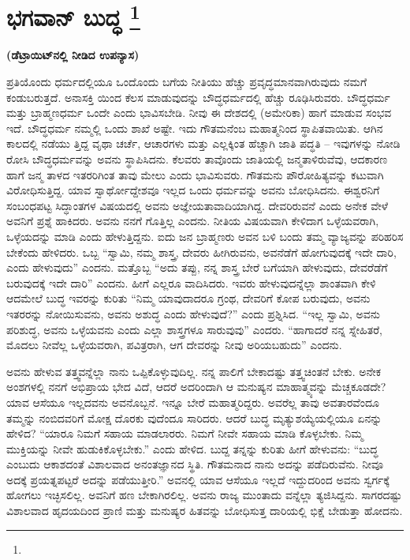 
\chapter[ಭಗವಾನ್ ಬುದ್ಧ ]{ಭಗವಾನ್ ಬುದ್ಧ \protect\footnote{}}

\centerline{\textbf{(ಡೆಟ್ರಾಯಿಟ್​ನಲ್ಲಿ ನೀಡಿದ ಉಪನ್ಯಾಸ)}}

ಪ್ರತಿಯೊಂದು ಧರ್ಮದಲ್ಲಿಯೂ ಒಂದೊಂದು ಬಗೆಯ ನೀತಿಯು ಹೆಚ್ಚು ಪ್ರವೃದ್ಧಮಾನವಾಗಿರುವುದು ನಮಗೆ ಕಂಡುಬರುತ್ತದೆ. ಅನಾಸಕ್ತಿ ಯಿಂದ ಕೆಲಸ ಮಾಡುವುದನ್ನು ಬೌದ್ಧಧರ್ಮದಲ್ಲಿ ಹೆಚ್ಚು ರೂಢಿಸಿರುವರು. ಬೌದ್ಧಧರ್ಮ ಮತ್ತು ಬ್ರಾಹ್ಮಣಧರ್ಮ ಒಂದೇ ಎಂದು ಭಾವಿಸಬೇಡಿ. ನೀವು ಈ ದೇಶದಲ್ಲಿ (ಅಮೇರಿಕಾ) ಹಾಗೆ ಮಾಡುವ ಸಂಭವ ಇದೆ. ಬೌದ್ಧಧರ್ಮ ನಮ್ಮಲ್ಲಿ ಒಂದು ಶಾಖೆ ಅಷ್ಟೇ. ಇದು ಗೌತಮನೆಂಬ ಮಹಾತ್ಮನಿಂದ ಸ್ಥಾಪಿತವಾಯಿತು. ಆಗಿನ ಕಾಲದಲ್ಲಿ ನಡೆಯು ತ್ತಿದ್ದ ವೃಥಾ ಚರ್ಚೆ, ಆಚಾರಗಳು ಮತ್ತು ಎಲ್ಲಕ್ಕಿಂತ ಹೆಚ್ಚಾಗಿ ಜಾತಿ ಪದ್ಧತಿ – ಇವುಗಳನ್ನು ನೋಡಿ ರೋಸಿ ಬೌದ್ಧಧರ್ಮವನ್ನು ಅವನು ಸ್ಥಾಪಿಸಿದನು. ಕೆಲವರು ತಾವೊಂದು ಜಾತಿಯಲ್ಲಿ ಜನ್ಮತಾಳಿರುವೆವು, ಆದಕಾರಣ ಹಾಗೆ ಜನ್ಮ ತಾಳದ ಇತರರಿಗಿಂತ ತಾವು ಮೇಲು ಎಂದು ಭಾವಿಸುವರು. ಗೌತಮನು ಪೌರೋಹಿತ್ಯವನ್ನು ಕಟುವಾಗಿ ವಿರೋಧಿಸುತ್ತಿದ್ದ. ಯಾವ ಸ್ವಾರ್ಥೋದ್ದೇಶವೂ ಇಲ್ಲದ ಒಂದು ಧರ್ಮವನ್ನು ಅವನು ಬೋಧಿಸಿದನು. ಈಶ್ವರನಿಗೆ ಸಂಬಂಧಪಟ್ಟ ಸಿದ್ಧಾಂತಗಳ ವಿಷಯದಲ್ಲಿ ಅವನು ಅಜ್ಞೇಯತಾವಾದಿಯಾಗಿದ್ದ. ದೇವರಿರುವನೆ ಎಂದು ಅನೇಕ ವೇಳೆ ಅವನಿಗೆ ಪ್ರಶ್ನೆ ಹಾಕಿದರು. ಅವನು ನನಗೆ ಗೊತ್ತಿಲ್ಲ ಎಂದನು. ನೀತಿಯ ವಿಷಯವಾಗಿ ಕೇಳಿದಾಗ ಒಳ್ಳೆಯವರಾಗಿ, ಒಳ್ಳೆಯದನ್ನು ಮಾಡಿ ಎಂದು ಹೇಳುತ್ತಿದ್ದನು. ಐದು ಜನ ಬ್ರಾಹ್ಮಣರು ಅವನ ಬಳಿ ಬಂದು ತಮ್ಮ ವ್ಯಾಜ್ಯವನ್ನು ಪರಿಹರಿಸ ಬೇಕೆಂದು ಹೇಳಿದರು. ಒಬ್ಬ “ಸ್ವಾಮಿ, ನಮ್ಮ ಶಾಸ್ತ್ರ, ದೇವರು ಹೀಗಿರುವನು, ಅವನೆಡೆಗೆ ಹೋಗುವುದಕ್ಕೆ ಇದೇ ದಾರಿ, ಎಂದು ಹೇಳುವುದು” ಎಂದನು. ಮತ್ತೊಬ್ಬ “ಅದು ತಪ್ಪು, ನನ್ನ ಶಾಸ್ತ್ರ ಬೇರೆ ಬಗೆಯಾಗಿ ಹೇಳುವುದು, ದೇವರೆಡೆಗೆ ಬರುವುದಕ್ಕೆ ಇದೇ ದಾರಿ” ಎಂದನು. ಹೀಗೆ ಎಲ್ಲರೂ ವಾದಿಸಿದರು. ಇವರು ಹೇಳುವುದನ್ನೆಲ್ಲಾ ಶಾಂತವಾಗಿ ಕೇಳಿ ಆದಮೇಲೆ ಬುದ್ಧ ಇವರನ್ನು ಕುರಿತು “ನಿಮ್ಮ ಯಾವುದಾದರೂ ಗ್ರಂಥ, ದೇವರಿಗೆ ಕೋಪ ಬರುವುದು, ಅವನು ಇತರರನ್ನು ನೋಯಿಸುವನು, ಅವನು ಅಶುದ್ಧ ಎಂದು ಹೇಳುವುದೆ?” ಎಂದು ಪ್ರಶ್ನಿಸಿದ. “ಇಲ್ಲ ಸ್ವಾಮಿ, ಅವನು ಪರಿಶುದ್ಧ, ಅವನು ಒಳ್ಳೆಯವನು ಎಂದು ಎಲ್ಲಾ ಶಾಸ್ತ್ರಗಳೂ ಸಾರುವುವು” ಎಂದರು. “ಹಾಗಾದರೆ ನನ್ನ ಸ್ನೇಹಿತರೆ, ಮೊದಲು ನೀವೆಲ್ಲ ಒಳ್ಳೆಯವರಾಗಿ, ಪವಿತ್ರರಾಗಿ, ಆಗ ದೇವರನ್ನು ನೀವು ಅರಿಯಬಹುದು” ಎಂದನು.

ಅವನು ಹೇಳುವ ತತ್ತ್ವವನ್ನೆಲ್ಲಾ ನಾನು ಒಪ್ಪಿಕೊಳ್ಳುವುದಿಲ್ಲ. ನನ್ನ ಪಾಲಿಗೆ ಬೇಕಾದಷ್ಟು ತತ್ತ್ವಚಿಂತನೆ ಬೇಕು. ಅನೇಕ ಅಂಶಗಳಲ್ಲಿ ನನಗೆ ಅಭಿಪ್ರಾಯ ಭೇದ ವಿದೆ, ಆದರೆ ಅದರಿಂದಾಗಿ ಆ ಮನುಷ್ಯನ ಮಾಹಾತ್ಮ್ಯವನ್ನು ಮೆಚ್ಚಕೂಡದೇ? ಯಾವ ಆಸೆಯೂ ಇಲ್ಲದವನು ಅವನೊಬ್ಬನೆ. ಇನ್ನೂ ಬೇರೆ ಮಹಾತ್ಮರಿದ್ದರು. ಅವರೆಲ್ಲ ತಾವು ಅವತಾರವೆಂದೂ ತಮ್ಮನ್ನು ನಂಬಿದವರಿಗೆ ಮೋಕ್ಷ ದೊರಕು ವುದೆಂದೂ ಸಾರಿದರು. ಆದರೆ ಬುದ್ಧ ಮೃತ್ಯುಶಯ್ಯೆಯಲ್ಲಿಯೂ ಏನನ್ನು ಹೇಳಿದ? “ಯಾರೂ ನಿಮಗೆ ಸಹಾಯ ಮಾಡಲಾರರು. ನಿಮಗೆ ನೀವೇ ಸಹಾಯ ಮಾಡಿ ಕೊಳ್ಳಬೇಕು. ನಿಮ್ಮ ಮುಕ್ತಿಯನ್ನು ನೀವೇ ಹುಡುಕಿಕೊಳ್ಳಬೇಕು.” ಎಂದು ಹೇಳಿದ. ಬುದ್ದ ತನ್ನನ್ನು ಕುರಿತು ಹೀಗೆ ಹೇಳುವನು: “ಬುದ್ಧ ಎಂಬುದು ಆಕಾಶದಂತೆ ವಿಶಾಲವಾದ ಅನಂತಜ್ಞಾನದ ಸ್ಥಿತಿ. ಗೌತಮನಾದ ನಾನು ಅದನ್ನು ಪಡೆದಿರುವೆನು. ನೀವೂ ಅದಕ್ಕೆ ಪ್ರಯತ್ನಪಟ್ಟರೆ ಅದನ್ನು ಪಡೆಯುತ್ತೀರಿ.” ಅವನಲ್ಲಿ ಯಾವ ಆಸೆಯೂ ಇಲ್ಲದೆ ಇದ್ದುದರಿಂದ ಅವನು ಸ್ವರ್ಗಕ್ಕೆ ಹೋಗಲು ಇಚ್ಛಿಸಲಿಲ್ಲ. ಅವನಿಗೆ ಹಣ ಬೇಕಾಗಿರಲಿಲ್ಲ. ಅವನು ರಾಜ್ಯ ಮುಂತಾದು ವನ್ನೆಲ್ಲಾ ತ್ಯಜಿಸಿದ್ದನು. ಸಾಗರದಷ್ಟು ವಿಶಾಲವಾದ ಹೃದಯದಿಂದ ಪ್ರಾಣಿ ಮತ್ತು ಮನುಷ್ಯರ ಹಿತವನ್ನು ಬೋಧಿಸುತ್ತ ದಾರಿಯಲ್ಲಿ ಭಿಕ್ಷೆ ಬೇಡುತ್ತಾ ಹೋದನು.

